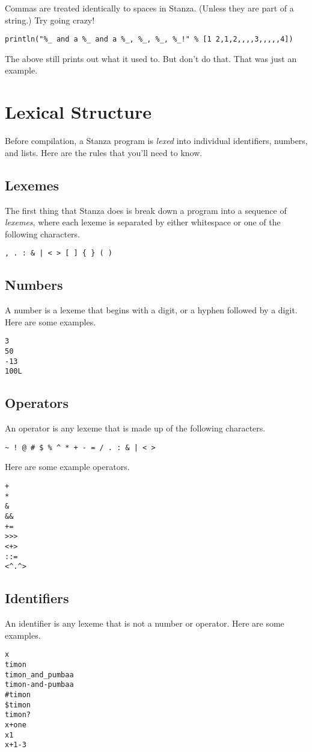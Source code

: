 \documentclass[10pt,oneside]{book}
\begin{document}
Commas are treated identically to spaces in Stanza. (Unless they are part of a string.) Try going crazy!
\begin{lstlisting}
println("%_ and a %_ and a %_, %_, %_, %_!" % [1 2,1,2,,,,3,,,,,4])
\end{lstlisting}
The above still prints out what it used to. But don't do that. That was just an example.

\section{Lexical Structure}
Before compilation, a Stanza program is {\em lexed} into individual identifiers, numbers, and lists. Here are the rules that you'll need to know.

\subsection*{Lexemes}
The first thing that Stanza does is break down a program into a sequence of {\em lexemes}, where each lexeme is separated by either whitespace or one of the following characters.
\begin{lstlisting}
, . : & | < > [ ] { } ( )
\end{lstlisting}

\subsection*{Numbers}
A number is a lexeme that begins with a digit, or a hyphen followed by a digit. Here are some examples.
\begin{lstlisting}
3
50
-13
100L
\end{lstlisting}

\subsection*{Operators}
An operator is any lexeme that is made up of the following characters.
\begin{lstlisting}
~ ! @ # $ % ^ * + - = / . : & | < >
\end{lstlisting}
Here are some example operators.
\begin{lstlisting}
+
*
&
&&
+=
>>>
<+>
::=
<^.^>
\end{lstlisting}

\subsection*{Identifiers}
An identifier is any lexeme that is not a number or operator. Here are some examples.
\begin{lstlisting}
x
timon
timon_and_pumbaa
timon-and-pumbaa
#timon
$timon
timon?
x+one
x1
x+1-3
\end{lstlisting}
\end{document}

